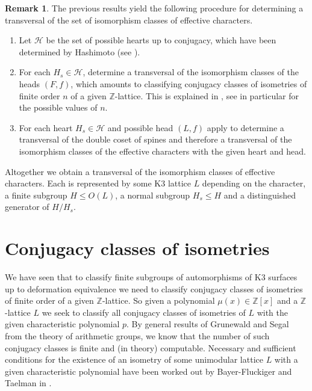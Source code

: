 \documentclass[a4paper]{amsart}
\theoremstyle{definition}
\newtheorem{remark}[definition]{Remark}
\theoremstyle{plain}
\newcommand{\ZZ}{\mathbb{Z}}
\begin{document}
\begin{remark}
The previous results yield the following procedure for determining a transversal of the set of isomorphism classes of effective characters.
  \begin{enumerate}
    \item
      Let $\mathcal{H}$ be the set of possible hearts up to conjugacy, which have been determined by Hashimoto \cite{Hashimoto2012} (see ).
    \item
      For each $H_s \in \mathcal{H}$, determine a transversal of the isomorphism classes of the heads $(F, f)$, which amounts to classifying conjugacy classes of isometries of finite order $n$ of a given $\ZZ$-lattice.
      This is explained in , see in particular  for the possible values of $n$.
    \item
      For each heart $H_s \in \mathcal{H}$ and possible head $(L, f)$ apply  to determine
      a transversal of the double coset of spines and therefore a transversal of the isomorphism classes of the effective characters with the given heart and head.
  \end{enumerate}
  Altogether we obtain a transversal of the isomorphism classes of effective characters.
Each is represented by some K3 lattice $L$ depending on the character, a finite subgroup $H \leq O(L)$, a normal subgroup $H_s \leq H$ and a distinguished generator of $H/H_s$.
\end{remark}

%

%
%
%
%


%
%
%
%
%
%
%
%
%
%
%
%
%
%
%
%
%
%
%
%
%
%
%
%
%
%
%
%
%
%
%
%
%
%
%
%
%
%
%
%
%
%
%
%
%
%
%
%
%
%
%
%
%
%
%
%
%
%
%
%
%
%
%
%
%
%
%
%
%
%
%
%
%
%
%
%
%
%
%
%
%
%
%
%
%
%
%
%
%
%
%
%
%
%
%
%
%
%
%
%
%
%
%
%
%
%
%
%
%
%
%
%
%
%
%
%
%
%
%
%
%
%
%
%
%
%
%
%
%
%
%
%
%
%
%
%
%
%
%
%
%
%
%
%
%
%
%
%
%
%
%
%
%
%
%
%
%
%
%
%
%
%
%
%
%
%
%
%
%
%
%
%
%
%
%
%
%
%
%
%
%
%
%
%
%
%
%
%
%
%
%
%
%
\section{Conjugacy classes of isometries}\label{ConjAlg}
We have seen that to classify finite subgroups of automorphisms of K3 surfaces up to deformation equivalence we need to classify conjugacy classes of isometries of finite order of a given $\ZZ$-lattice.
So given a polynomial $\mu(x) \in \ZZ[x]$ and a $\ZZ$-lattice $L$
we seek to classify all conjugacy classes of isometries of $L$ with the given characteristic polynomial $p$.
By general results of Grunewald and Segal \cite[Cor. 1]{grunewald:conjugacy} from the theory of arithmetic groups, we know that the number of such conjugacy classes is finite and (in theory) computable.
Necessary and sufficient conditions for the existence of an isometry of some unimodular lattice $L$ with a given characteristic polynomial have been worked out by Bayer-Fluckiger and Taelman in \cite{fluckiger20,fluckiger21,fluckiger21b}.
\end{document}

